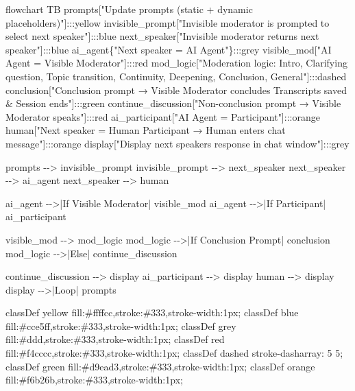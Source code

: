 \documentclass[
  letterpaper,
  DIV=11,
  numbers=noendperiod]{scrartcl}
\newenvironment{Shaded}{\begin{snugshade}}{\end{snugshade}}
\newcommand{\NormalTok}[1]{\textcolor[rgb]{0.00,0.23,0.31}{#1}}
\begin{document}
\begin{Shaded}
\begin{Highlighting}[]
\NormalTok{flowchart TB}
\NormalTok{    prompts["Update prompts (static + dynamic placeholders)"]:::yellow}
\NormalTok{    invisible\_prompt["Invisible moderator is prompted to select next speaker"]:::blue}
\NormalTok{    next\_speaker["Invisible moderator returns next speaker"]:::blue}
\NormalTok{    ai\_agent\{"Next speaker = AI Agent"\}:::grey}
\NormalTok{    visible\_mod["AI Agent = Visible Moderator"]:::red}
\NormalTok{    mod\_logic["Moderation logic: Intro, Clarifying question, Topic transition, Continuity, Deepening, Conclusion, General"]:::dashed}
\NormalTok{    conclusion["Conclusion prompt → Visible Moderator concludes}
\NormalTok{Transcripts saved \& Session ends"]:::green}
\NormalTok{    continue\_discussion["Non{-}conclusion prompt → Visible Moderator speaks"]:::red}
\NormalTok{    ai\_participant["AI Agent = Participant"]:::orange}
\NormalTok{    human["Next speaker = Human Participant}
\NormalTok{→ Human enters chat message"]:::orange}
\NormalTok{    display["Display next speaker\textquotesingle{}s response in chat window"]:::grey}

\NormalTok{    prompts {-}{-}\textgreater{} invisible\_prompt}
\NormalTok{    invisible\_prompt {-}{-}\textgreater{} next\_speaker}
\NormalTok{    next\_speaker {-}{-}\textgreater{} ai\_agent}
\NormalTok{    next\_speaker {-}{-}\textgreater{} human}

\NormalTok{    ai\_agent {-}{-}\textgreater{}|If Visible Moderator| visible\_mod}
\NormalTok{    ai\_agent {-}{-}\textgreater{}|If Participant| ai\_participant}

\NormalTok{    visible\_mod {-}{-}\textgreater{} mod\_logic}
\NormalTok{    mod\_logic {-}{-}\textgreater{}|If Conclusion Prompt| conclusion}
\NormalTok{    mod\_logic {-}{-}\textgreater{}|Else| continue\_discussion}

\NormalTok{    continue\_discussion {-}{-}\textgreater{} display}
\NormalTok{    ai\_participant {-}{-}\textgreater{} display}
\NormalTok{    human {-}{-}\textgreater{} display}
\NormalTok{    display {-}{-}\textgreater{}|Loop| prompts}

\NormalTok{classDef yellow fill:\#ffffcc,stroke:\#333,stroke{-}width:1px;}
\NormalTok{classDef blue fill:\#cce5ff,stroke:\#333,stroke{-}width:1px;}
\NormalTok{classDef grey fill:\#ddd,stroke:\#333,stroke{-}width:1px;}
\NormalTok{classDef red fill:\#f4cccc,stroke:\#333,stroke{-}width:1px;}
\NormalTok{classDef dashed stroke{-}dasharray: 5 5;}
\NormalTok{classDef green fill:\#d9ead3,stroke:\#333,stroke{-}width:1px;}
\NormalTok{classDef orange fill:\#f6b26b,stroke:\#333,stroke{-}width:1px;}
\end{Highlighting}
\end{Shaded}
\end{document}
